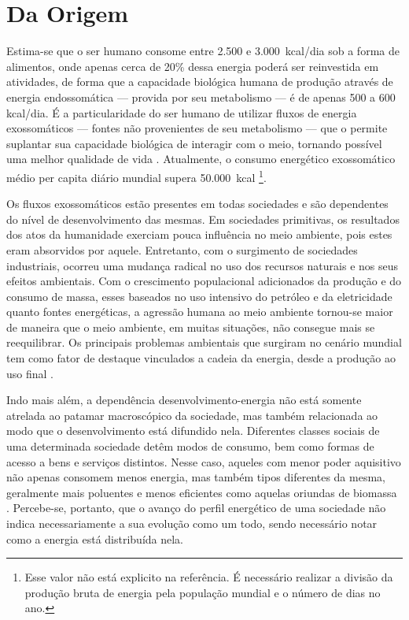 \section{Da Origem}
\label{sec:ee_origem}

Estima-se que o ser humano consome entre 2.500 e 3.000~\acs{kcal}/dia
sob a forma de alimentos, onde apenas cerca de 20\% dessa energia
poderá ser reinvestida em atividades, de forma que a capacidade
biológica humana de produção através de energia endossomática ---
provida por seu metabolismo --- é de apenas 500 a 600 \acs{kcal}/dia.
É a particularidade do ser humano de utilizar fluxos de energia
exossomáticos --- fontes não provenientes de seu metabolismo --- que o
permite suplantar sua capacidade biológica de interagir com o meio,
tornando possível uma melhor qualidade de vida \cite{rippel}.
Atualmente, o consumo energético exossomático médio per capita diário
mundial supera 50.000~\acs{kcal}
\cite{world_statics_2012}\footnote{Esse valor não está explicito na
referência. É necessário realizar a divisão da produção bruta de
energia pela população mundial e o número de dias no ano.}.

Os fluxos exossomáticos estão presentes em todas sociedades e são
dependentes do nível de desenvolvimento das mesmas. Em sociedades
primitivas, os resultados dos atos da humanidade exerciam pouca
influência no meio ambiente, pois estes eram absorvidos por aquele.
Entretanto, com o surgimento de sociedades industriais, ocorreu uma
mudança radical no uso dos recursos naturais e nos seus efeitos
ambientais. Com o crescimento populacional adicionados da produção e do
consumo de massa, esses baseados no uso intensivo do petróleo e da
eletricidade quanto fontes energéticas, a agressão humana ao meio
ambiente tornou-se maior de maneira que o meio ambiente, em muitas
situações, não consegue mais se reequilibrar.  Os principais problemas
ambientais que surgiram no cenário mundial tem como fator de destaque
vinculados a cadeia da energia, desde a produção ao uso final
\cite{rippel,jatoba}.

Indo mais além, a dependência desenvolvimento-energia não está somente
atrelada ao patamar macroscópico da sociedade, mas também relacionada
ao modo que o desenvolvimento está difundido nela. Diferentes classes
sociais de uma determinada sociedade detêm modos de consumo, bem como
formas de acesso a bens e serviços distintos. Nesse caso, aqueles com
menor poder aquisitivo não apenas consomem menos energia, mas também
tipos diferentes da mesma, geralmente mais poluentes e menos
eficientes como aquelas oriundas de biomassa \cite{rippel}.
Percebe-se, portanto, que o avanço do perfil energético de uma
sociedade não indica necessariamente a sua evolução como um todo,
sendo necessário notar como a energia está distribuída nela.

